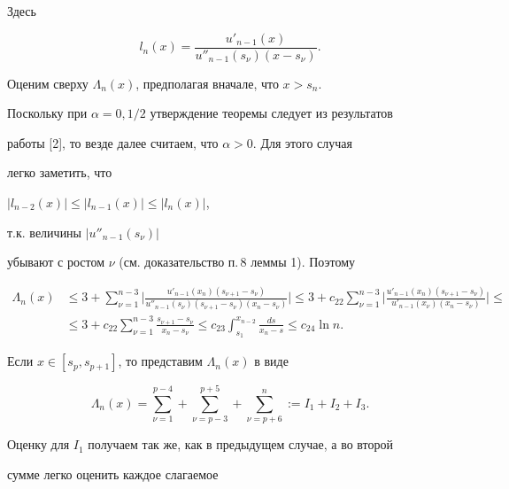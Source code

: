 Здесь


$$


l_n(x)=\frac{u'_{n-1}(x)}


{u''_{n-1}(s_\nu)(x-s_\nu)}.


$$


Оценим сверху $\Lambda_n(x)$, предполагая вначале, что $x>s_n$.


Поскольку при $\alpha=0,1/2$ утверждение теоремы следует из результатов


работы [2], то везде далее считаем, что $\alpha>0$. Для этого случая


легко заметить, что 


$|l_{n-2}(x)|\leq| l_{n-1}(x)|\leq| l_n(x)|$,


т.к. величины $|u''_{n-1}(s_\nu)|$


убывают с ростом $\nu$ (см. доказательство п.\,8 леммы 1). Поэтому


\begin{align*}


\Lambda_n(x)&\leq3+\sum_{\nu=1}^{n-3}\bigg|


\frac{u'_{n-1}(x_n)(s_{\nu+1}-s_\nu)}


{u''_{n-1}(s_\nu)(s_{\nu+1}-s_\nu)(x_n-s_\nu)}


\bigg|\leq3+c_{22}\sum_{\nu=1}^{n-3}\bigg|


\frac{u'_{n-1}(x_n)(s_{\nu+1}-s_\nu)}


{u'_{n-1}(x_\nu)(x_n-s_\nu)}


\bigg|\leq \\


%


&\leq3+c_{22}\sum_{\nu=1}^{n-3}\frac{s_{\nu+1}-s_\nu}{x_n-s_\nu}


\leq c_{23}\int_{s_1}^{x_{n-2}}\frac{ds}{x_n-s}\leq c_{24}\ln n.


\end{align*}


Если $x\in[s_p,s_{p+1}]$, то представим $\Lambda_n(x)$ в виде


\begin{equation}


\Lambda_n(x)= \sum_{\nu=1}^{p-4}+\sum_{\nu=p-3}^{p+5}


+\sum_{\nu=p+6}^n:=I_1+I_2+I_3.


\end{equation}


Оценку для $I_1$ получаем так же, как в предыдущем случае, а во второй


сумме легко оценить каждое слагаемое



